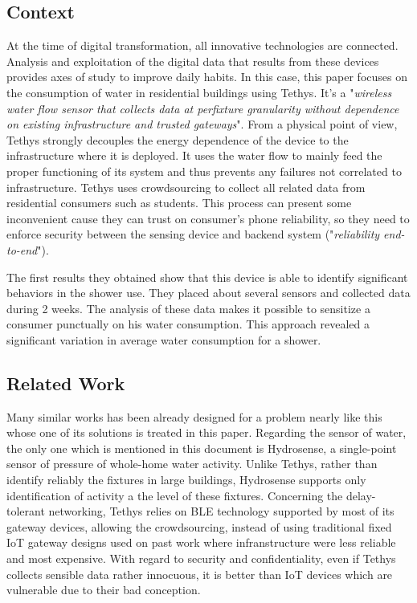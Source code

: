 \documentclass[10pt,journal,compsoc]{IEEEtran}
\begin{document}
\subsection{Context}
At the time of digital transformation, all innovative technologies are connected. Analysis and exploitation of the digital data that results from these devices provides axes of study to improve daily habits. In this case, this paper focuses on the consumption of water in residential buildings using Tethys. It's a "\emph{wireless water flow sensor that collects data at perfixture granularity without dependence on existing infrastructure and trusted gateways}"\cite{IEEEhowto:}. From a physical point of view, Tethys strongly decouples the energy dependence of the device to the infrastructure where it is deployed. It uses the water flow to mainly feed the proper functioning of its system and thus prevents any failures not correlated to infrastructure. Tethys uses crowdsourcing to collect all related data from residential consumers such as students. This process can present some inconvenient cause they can trust on consumer's phone reliability, so they need to enforce security between the sensing device and backend system ("\emph{reliability end-to-end}").

The first results they obtained show that this device is able to identify significant behaviors in the shower use. They placed about several sensors and collected data during 2 weeks. The analysis of these data makes it possible to sensitize a consumer punctually on his water consumption. This approach revealed a significant variation in average water consumption for a shower.

\subsection{Related Work}
Many similar works has been already designed for a problem nearly like this whose one of its solutions is treated in this paper.
Regarding the sensor of water, the only one which is mentioned in this document is Hydrosense, \cite{ref1} a single-point sensor of pressure of whole-home water activity. Unlike Tethys, rather than identify reliably the fixtures in large buildings, Hydrosense supports only identification of activity  a the level of these fixtures.
Concerning the delay-tolerant networking, Tethys relies on BLE technology supported by most of its gateway devices, allowing the crowdsourcing, instead of using traditional fixed IoT gateway designs used on past work where infranstructure were less reliable and most expensive.
With regard to security and confidentiality, even if Tethys collects sensible data rather innocuous, it is better than IoT devices which are vulnerable due to their bad conception.
\end{document}
